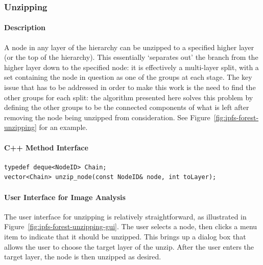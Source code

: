 \subsubsection{Unzipping}

\paragraph{Description}

A node in any layer of the hierarchy can be unzipped to a specified higher layer (or the top of the hierarchy). This essentially `separates out' the branch from the higher layer down to the specified node: it is effectively a multi-layer split, with a set containing the node in question as one of the groups at each stage. The key issue that has to be addressed in order to make this work is the need to find the other groups for each split: the algorithm presented here solves this problem by defining the other groups to be the connected components of what is left after removing the node being unzipped from consideration. See Figure~\ref{fig:ipfs-forest-unzipping} for an example.


\paragraph{C++ Method Interface}

\begin{lstlisting}[style=Prototype]
typedef deque<NodeID> Chain;
vector<Chain> unzip_node(const NodeID& node, int toLayer);
\end{lstlisting}

\paragraph{User Interface for Image Analysis}

The user interface for unzipping is relatively straightforward, as illustrated in Figure~\ref{fig:ipfs-forest-unzipping-gui}. The user selects a node, then clicks a menu item to indicate that it should be unzipped. This brings up a dialog box that allows the user to choose the target layer of the unzip. After the user enters the target layer, the node is then unzipped as desired.

